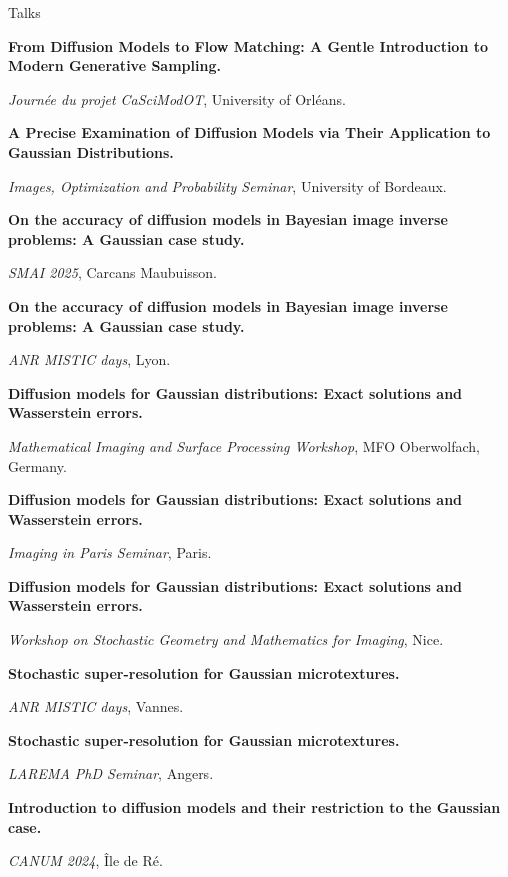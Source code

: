 \begin{rubric}{Talks}

\entry*[December 2026]%
\textbf{From Diffusion Models to Flow Matching: A Gentle Introduction to Modern Generative Sampling.}
\par \emph{Journée du projet CaSciModOT}, University of Orléans.

\entry*[June 2025]%
\textbf{A Precise Examination of Diffusion Models via Their Application to Gaussian Distributions.}
\par \emph{Images, Optimization and Probability Seminar}, University of Bordeaux.

\entry*[June 2025 ]%
\textbf{On the accuracy of diffusion models in Bayesian image inverse problems: A Gaussian case study.}
\par \emph{SMAI 2025}, Carcans Maubuisson.

\entry*[May 2025]%
\textbf{On the accuracy of diffusion models in Bayesian image inverse problems: A Gaussian case study.}
\par \emph{ANR MISTIC days}, Lyon.

\entry*[February 2025]%
\textbf{Diffusion models for Gaussian distributions: Exact solutions and Wasserstein errors.}
\par \emph{Mathematical Imaging and Surface Processing Workshop}, MFO Oberwolfach, Germany.

\entry*[January 2025]%
\textbf{Diffusion models for Gaussian distributions: Exact solutions and Wasserstein errors.}
\par \emph{Imaging in Paris Seminar}, Paris.

\entry*[November 2024]%
\textbf{Diffusion models for Gaussian distributions: Exact solutions and Wasserstein errors.}
\par \emph{Workshop on Stochastic Geometry and Mathematics for Imaging}, Nice.

\entry*[October 2024]%
\textbf{Stochastic super-resolution for Gaussian microtextures.}
\par \emph{ANR MISTIC days}, Vannes.

\entry*[June 2024]%
\textbf{Stochastic super-resolution for Gaussian microtextures.}
\par \emph{LAREMA PhD Seminar}, Angers.

\entry*[May 2024]%
\textbf{Introduction to diffusion models and their restriction to the Gaussian case.}
\par \emph{CANUM 2024}, Île de Ré.


\end{rubric}
